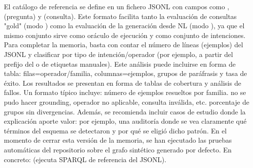{}El catálogo de referencia se define en un fichero JSONL con campos como ,  (pregunta) y  (consulta). Este formato facilita tanto la evaluación de consultas "gold" (modo ) como la evaluación de la generación desde NL (modo ), ya que el mismo conjunto sirve como oráculo de ejecución y como conjunto de intenciones.\markdownRendererInterblockSeparator
{} Para completar la memoria, basta con contar el número de líneas (ejemplos) del JSONL y clasificar por tipo de intención/operador (por ejemplo, a partir del prefijo del  o de etiquetas manuales). Este análisis puede incluirse en forma de tabla: filas=operador/familia, columnas=\markdownRendererBackslash{}\markdownRendererHash{}ejemplos, \markdownRendererBackslash{}\markdownRendererHash{}grupos de paráfrasis y tasa de éxito.\markdownRendererInterblockSeparator
{}\markdownRendererInterblockSeparator
{}Los resultados se presentan en forma de tablas de cobertura y análisis de fallos. Un formato típico incluye:\markdownRendererInterblockSeparator
{}\markdownRendererUlBeginTight
\markdownRendererUlItem {} número de ejemplos resueltos por familia.\markdownRendererUlItemEnd 
\markdownRendererUlItem {} no se pudo hacer grounding, operador no aplicable, consulta inválida, etc.\markdownRendererUlItemEnd 
\markdownRendererUlItem {} porcentaje de grupos sin divergencias.\markdownRendererUlItemEnd 
\markdownRendererUlEndTight \markdownRendererInterblockSeparator
{}Además, se recomienda incluir casos de estudio donde la explicación aporte valor: por ejemplo, una auditoría  donde se vea claramente qué términos del esquema se detectaron y por qué se eligió dicho patrón.\markdownRendererInterblockSeparator
{}En el momento de cerrar esta versión de la memoria, se han ejecutado las pruebas automáticas del repositorio sobre el grafo sintético generado por defecto. En concreto:\markdownRendererInterblockSeparator
{}\markdownRendererUlBeginTight
\markdownRendererUlItem {} (ejecuta SPARQL de referencia del JSONL).\markdownRendererUlItemEnd 
